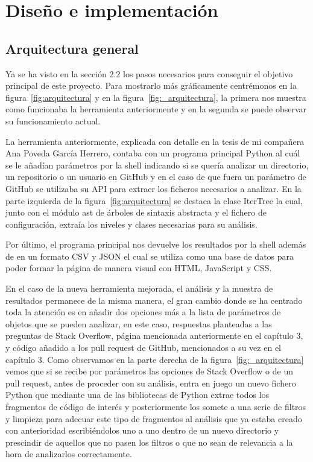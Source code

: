 \documentclass[a4paper, 12pt]{book}
\begin{document}

\cleardoublepage
\chapter{Diseño e implementación}

\section{Arquitectura general} 
\label{sec:arquitectura}

Ya se ha visto en la sección 2.2 los pasos necesarios para conseguir el objetivo principal de este proyecto. Para mostrarlo más gráficamente centrémonos en la figura~\ref{fig:arquitectura} y en la figura~\ref{fig:_arquitectura}, la primera nos muestra como funcionaba la herramienta anteriormente y en la segunda se puede observar su funcionamiento actual.

La herramienta anteriormente, explicada con detalle en la tesis de mi compañera Ana Poveda García Herrero, contaba con un programa principal Python al cuál se le añadían parámetros por la shell indicando si se quería analizar un directorio, un repositorio o un usuario en GitHub y en el caso de que fuera un parámetro de GitHub se utilizaba su API para extraer los ficheros necesarios a analizar. En la parte izquierda de la figura~\ref{fig:arquitectura} se destaca la clase IterTree la cual, junto con el módulo ast de árboles de sintaxis abstracta y el fichero de configuración, extraía los niveles y clases necesarias para su análisis. 

Por último, el programa principal nos devuelve los resultados por la shell además de en un formato CSV y JSON el cual se utiliza como una base de datos para poder formar la página de manera visual con HTML, JavaScript y CSS.

En el caso de la nueva herramienta mejorada, el análisis y la muestra de resultados permanece de la misma manera, el gran cambio donde se ha centrado toda la atención es en añadir dos opciones más a la lista de parámetros de objetos que se pueden analizar, en este caso, respuestas planteadas a las preguntas de Stack Overflow, página mencionada anteriormente en el capítulo 3, y código añadido a los pull request de GitHub, mencionados a su vez en el capítulo 3. Como observamos en la parte derecha de la figura~\ref{fig:_arquitectura} vemos que si se recibe por parámetros las opciones de Stack Overflow o de un pull request, antes de proceder con su análisis, entra en juego un nuevo fichero Python que mediante una de las bibliotecas de Python extrae todos los fragmentos de código de interés y posteriormente los somete a una serie de filtros y limpieza para adecuar este tipo de fragmentos al análisis que ya estaba creado con anterioridad escribiéndolos uno a uno dentro de un nuevo directorio y prescindir de aquellos que no pasen los filtros o que no sean de relevancia a la hora de analizarlos correctamente.
\end{document}
